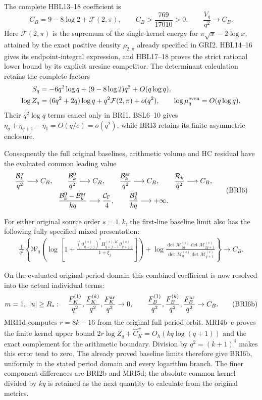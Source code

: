 \documentclass[11pt,a4paper]{article}
\begin{document}
The complete HBL13--18 coefficient is
\[
 C_B=9-8\log2+\mathcal F(2,\pi),\qquad
 C_B>\frac{769}{17010}>0,\qquad
 \frac{V_q}{q^2}\longrightarrow C_B.
 \tag{BRI5}
\]
Here $\mathcal F(2,\pi)$ is the supremum of the single-kernel
energy for $\pi\sqrt x-2\log x$, attained by the exact positive
density $\rho_{2,\pi}$ already specified in GRI2. HBL14--16
gives its endpoint-integral expression, and HBL17--18 proves
the strict rational lower bound by its explicit arcsine competitor.
The determinant calculation retains the complete factors
\[
\begin{split}
 S_q&=-6q^2\log q+(9-8\log2)q^2+O(q\log q),\\
 \log Z_q&=(6q^2+2q)\log q+q^2\mathcal F(2,\pi)+o(q^2),\qquad
 \log\mu_q^{\rm even}=O(q\log q).
\end{split}
\]
Their $q^2\log q$ terms cancel only in BRI1. BSL6--10 gives
$\eta_q+\eta_{q+1}-\eta_1=O(q/e)=o(q^2)$, while BRI3
retains its finite asymmetric enclosure.

Consequently the full original baselines, arithmetic volume and
HC residual have the evaluated common leading value
\[
\begin{gathered}
 \frac{\mathcal B_k^\sigma}{q^2}\longrightarrow C_B,\qquad
 \frac{\mathcal B_k^0}{q^2}\longrightarrow C_B,\qquad
 \frac{\mathcal B_k^{\rm ar}}{q^2}\longrightarrow C_B,\qquad
 \frac{\mathcal R_k}{q^2}\longrightarrow C_B,\\
 \frac{\mathcal B_k^0-\mathcal B_k^{\rm ar}}{kq}
                \longrightarrow\frac{\mathcal C_\Gamma}{4},
 \qquad \frac{\mathcal B_k^0}{kq}\longrightarrow+\infty.
\end{gathered}\tag{BRI6}
\]

For either original source order $s=1,k$, the first-line baseline
limit also has the following fully specified mixed presentation:
\[
\begin{split}
 \frac1{q^2}\left\{
 \mathcal W_q\left(\log\left[1+
   \frac{(\vartheta_{q+j,j}^{(s)})^*
        H_{q+j-1}^{(s),K}\vartheta_{q+j,j}^{(s)}}{1+\xi_j}
                                      \right]\right)
 +\log\frac{\det\mathcal M_{2q}^{(s)}\det\mathcal M_{2q+1}^{(s)}}
                 {\det\mathcal M_q^{(s)}\det\mathcal M_{q+1}^{(s)}}
                          \right\}\longrightarrow C_B.
\end{split}\tag{BRI6a}
\]

On the evaluated original period domain this combined
coefficient is now resolved into the actual individual terms:
\[
 m=1,\ |u|\ge R_*:\quad
 \frac{F_K^{(1)}}{q^2},\frac{F_K^{(k)}}{q^2},
 \frac{F_K^{\rm ar}}{q^2}\to0,\qquad
 \frac{F_B^{(1)}}{q^2},\frac{F_B^{(k)}}{q^2},
 \frac{F_B^{\rm ar}}{q^2}\to C_B.
 \tag{BRI6b}
\]
MRI1d computes $r=8k-16$ from the original full period
orbit. MRI4b--c proves the finite kernel upper bound
$2r\log Z_q+\widehat C_K^+=O_h(kq\log(q+1))$ and the
exact complement for the arithmetic boundary. Division by
$q^2=(k+1)^4$ makes this error tend to zero. The already
proved baseline limits therefore give BRI6b, uniformly in
the stated period domain and every logarithm branch.
The finer component differences are BRI2b and MRI5d;
the absolute common kernel divided by $kq$ is retained
as the next quantity to calculate from the original metrics.
\end{document}
